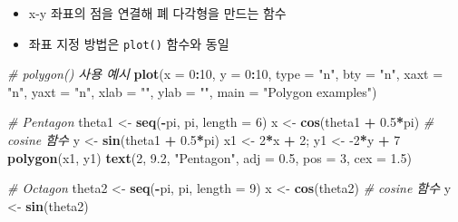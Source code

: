 \documentclass[
  11pt,
]{krantz}
\newenvironment{Shaded}{\begin{snugshade}}{\end{snugshade}}
\newcommand{\CommentTok}[1]{\textcolor[rgb]{0.37,0.37,0.37}{\textit{#1}}}
\newcommand{\DataTypeTok}[1]{\textcolor[rgb]{0.27,0.27,0.27}{#1}}
\newcommand{\DecValTok}[1]{\textcolor[rgb]{0.06,0.06,0.06}{#1}}
\newcommand{\FloatTok}[1]{\textcolor[rgb]{0.06,0.06,0.06}{#1}}
\newcommand{\KeywordTok}[1]{\textcolor[rgb]{0.27,0.27,0.27}{\textbf{#1}}}
\newcommand{\NormalTok}[1]{#1}
\newcommand{\OperatorTok}[1]{\textcolor[rgb]{0.43,0.43,0.43}{\textbf{#1}}}
\newcommand{\StringTok}[1]{\textcolor[rgb]{0.5,0.5,0.5}{#1}}
\providecommand{\tightlist}{%
  \setlength{\itemsep}{0pt}\setlength{\parskip}{0pt}}
\begin{document}
\begin{itemize}
\tightlist
\item
  x-y 좌표의 점을 연결해 폐 다각형을 만드는 함수
\item
  좌표 지정 방법은 \texttt{plot()} 함수와 동일
\end{itemize}

\footnotesize

\begin{Shaded}
\begin{Highlighting}[]
\CommentTok{# polygon() 사용 예시}
\KeywordTok{plot}\NormalTok{(}\DataTypeTok{x =} \DecValTok{0}\OperatorTok{:}\DecValTok{10}\NormalTok{,}
     \DataTypeTok{y =} \DecValTok{0}\OperatorTok{:}\DecValTok{10}\NormalTok{,}
     \DataTypeTok{type =} \StringTok{"n"}\NormalTok{,}
     \DataTypeTok{bty =} \StringTok{"n"}\NormalTok{,}
     \DataTypeTok{xaxt =} \StringTok{"n"}\NormalTok{,}
     \DataTypeTok{yaxt =} \StringTok{"n"}\NormalTok{,}
     \DataTypeTok{xlab =} \StringTok{""}\NormalTok{,}
     \DataTypeTok{ylab =} \StringTok{""}\NormalTok{,}
     \DataTypeTok{main =} \StringTok{"Polygon examples"}\NormalTok{)}

\CommentTok{# Pentagon}
\NormalTok{theta1 <-}\StringTok{ }\KeywordTok{seq}\NormalTok{(}\OperatorTok{-}\NormalTok{pi, pi, }\DataTypeTok{length =} \DecValTok{6}\NormalTok{)}
\NormalTok{x <-}\StringTok{ }\KeywordTok{cos}\NormalTok{(theta1 }\OperatorTok{+}\StringTok{ }\FloatTok{0.5}\OperatorTok{*}\NormalTok{pi) }\CommentTok{# cosine 함수}
\NormalTok{y <-}\StringTok{ }\KeywordTok{sin}\NormalTok{(theta1 }\OperatorTok{+}\StringTok{ }\FloatTok{0.5}\OperatorTok{*}\NormalTok{pi)}
\NormalTok{x1 <-}\StringTok{ }\DecValTok{2}\OperatorTok{*}\NormalTok{x }\OperatorTok{+}\StringTok{ }\DecValTok{2}\NormalTok{; y1 <-}\StringTok{ }\DecValTok{-2}\OperatorTok{*}\NormalTok{y }\OperatorTok{+}\StringTok{ }\DecValTok{7}
\KeywordTok{polygon}\NormalTok{(x1, y1)}
\KeywordTok{text}\NormalTok{(}\DecValTok{2}\NormalTok{, }\FloatTok{9.2}\NormalTok{, }\StringTok{"Pentagon"}\NormalTok{, }\DataTypeTok{adj =} \FloatTok{0.5}\NormalTok{, }\DataTypeTok{pos =} \DecValTok{3}\NormalTok{, }\DataTypeTok{cex =} \FloatTok{1.5}\NormalTok{)}

\CommentTok{# Octagon}
\NormalTok{theta2 <-}\StringTok{ }\KeywordTok{seq}\NormalTok{(}\OperatorTok{-}\NormalTok{pi, pi, }\DataTypeTok{length =} \DecValTok{9}\NormalTok{)}
\NormalTok{x <-}\StringTok{ }\KeywordTok{cos}\NormalTok{(theta2) }\CommentTok{# cosine 함수}
\NormalTok{y <-}\StringTok{ }\KeywordTok{sin}\NormalTok{(theta2)}


\end{Highlighting}
\end{Shaded}
\end{document}
